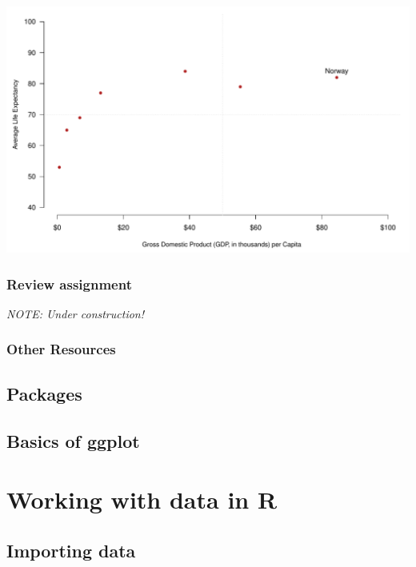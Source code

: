 \documentclass[
]{book}
\begin{document}
\includegraphics{figures/unnamed-chunk-108-1.pdf}

\hypertarget{review-assignment-4}{%
\section*{Review assignment}\label{review-assignment-4}}

\emph{NOTE: Under construction!}

\hypertarget{other-resources-4}{%
\section*{Other Resources}\label{other-resources-4}}

\hypertarget{packages}{%
\chapter{Packages}\label{packages}}

\hypertarget{basics-of-ggplot}{%
\chapter{Basics of ggplot}\label{basics-of-ggplot}}

\hypertarget{part-working-with-data-in-r}{%
\part{Working with data in R}\label{part-working-with-data-in-r}}

\hypertarget{importing-data}{%
\chapter{Importing data}\label{importing-data}}
\end{document}
